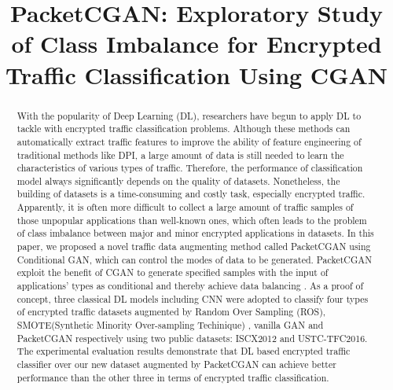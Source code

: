 \documentclass[conference]{IEEEtran}
\begin{document}
	
	\title{PacketCGAN: Exploratory Study of Class Imbalance for Encrypted Traffic Classification Using CGAN}
	
	
	
	
\author{
		}	
\maketitle
	
\begin{abstract}
With the popularity of Deep Learning (DL), researchers have begun to apply DL to tackle with  encrypted traffic classification problems. Although these methods can automatically extract traffic features to improve the ability of feature engineering of traditional methods like DPI, a large amount of data is still needed to learn the characteristics of various types of traffic. Therefore, the performance of classification model always significantly depends on the quality of datasets. Nonetheless, the building of datasets is a time-consuming and costly task, especially encrypted traffic. Apparently, it is often more difficult to collect a large amount of traffic samples of those unpopular applications than well-known ones, which often leads to the problem of class imbalance between major and minor encrypted applications in datasets. In this paper, we proposed a novel traffic data augmenting method called PacketCGAN using Conditional GAN, which can control the modes of data to be generated. PacketCGAN exploit the benefit of CGAN to generate specified samples with the input of  applications' types as conditional and thereby achieve data balancing . As a proof of concept, three classical DL models including CNN were adopted to classify four types of encrypted traffic datasets augmented by Random Over Sampling (ROS), SMOTE(Synthetic Minority Over-sampling Techinique) , vanilla GAN and PacketCGAN respectively using two public datasets: ISCX2012 and USTC-TFC2016. The experimental evaluation results demonstrate that DL based encrypted traffic classifier over our new dataset augmented by  PacketCGAN can achieve better performance than the other three in terms of encrypted traffic classification.
\end{abstract}
\end{document}
